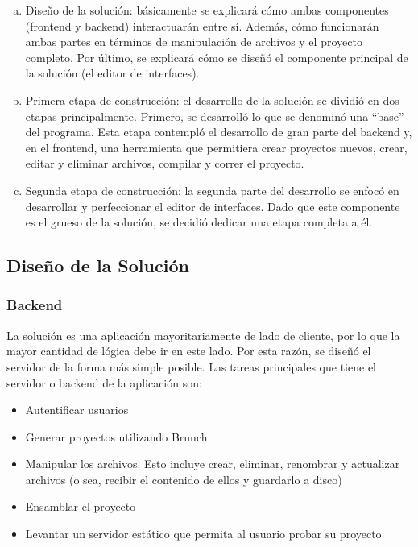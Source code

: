 \documentclass[12pt,titlepage,]{article}
\begin{document}
\begin{enumerate}[a.]
\item
  Diseño de la solución: básicamente se explicará cómo ambas componentes
  (frontend y backend) interactuarán entre sí. Además, cómo funcionarán
  ambas partes en términos de manipulación de archivos y el proyecto
  completo. Por último, se explicará cómo se diseñó el componente
  principal de la solución (el editor de interfaces).
\item
  Primera etapa de construcción: el desarrollo de la solución se dividió
  en dos etapas principalmente. Primero, se desarrolló lo que se
  denominó una ``base'' del programa. Esta etapa contempló el desarrollo
  de gran parte del backend y, en el frontend, una herramienta que
  permitiera crear proyectos nuevos, crear, editar y eliminar archivos,
  compilar y correr el proyecto.
\item
  Segunda etapa de construcción: la segunda parte del desarrollo se
  enfocó en desarrollar y perfeccionar el editor de interfaces. Dado que
  este componente es el grueso de la solución, se decidió dedicar una
  etapa completa a él.
\end{enumerate}

\subsection{Diseño de la Solución}

\subsubsection{Backend}

La solución es una aplicación mayoritariamente de lado de cliente, por
lo que la mayor cantidad de lógica debe ir en este lado. Por esta razón,
se diseñó el servidor de la forma más simple posible. Las tareas
principales que tiene el servidor o backend de la aplicación son:

\begin{itemize}
\item
  Autentificar usuarios
\item
  Generar proyectos utilizando Brunch
\item
  Manipular los archivos. Esto incluye crear, eliminar, renombrar y
  actualizar archivos (o sea, recibir el contenido de ellos y guardarlo
  a disco)
\item
  Ensamblar el proyecto
\item
  Levantar un servidor estático que permita al usuario probar su
  proyecto
\end{itemize}
\end{document}
